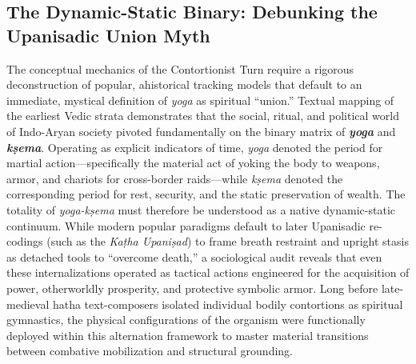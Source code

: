 \documentclass[11pt,letterpaper]{article}
\begin{document}
\subsection{The Dynamic-Static Binary: Debunking the Upanisadic Union Myth}
The conceptual mechanics of the Contortionist Turn require a rigorous deconstruction of popular, ahistorical tracking models that default to an immediate, mystical definition of \textit{yoga} as spiritual ``union.'' Textual mapping of the earliest Vedic strata demonstrates that the social, ritual, and political world of Indo-Aryan society pivoted fundamentally on the binary matrix of \textbf{\textit{yoga}} and \textbf{\textit{kṣema}}. Operating as explicit indicators of time, \textit{yoga} denoted the period for martial action---specifically the material act of yoking the body to weapons, armor, and chariots for cross-border raids---while \textit{kṣema} denoted the corresponding period for rest, security, and the static preservation of wealth. The totality of \textit{yoga-kṣema} must therefore be understood as a native dynamic-static continuum. While modern popular paradigms default to later Upanisadic re-codings (such as the \textit{Kaṭha Upaniṣad}) to frame breath restraint and upright stasis as detached tools to ``overcome death,'' a sociological audit reveals that even these internalizations operated as tactical actions engineered for the acquisition of power, otherworldly prosperity, and protective symbolic armor. Long before late-medieval hatha text-composers isolated individual bodily contortions as spiritual gymnastics, the physical configurations of the organism were functionally deployed within this alternation framework to master material transitions between combative mobilization and structural grounding.
\end{document}
